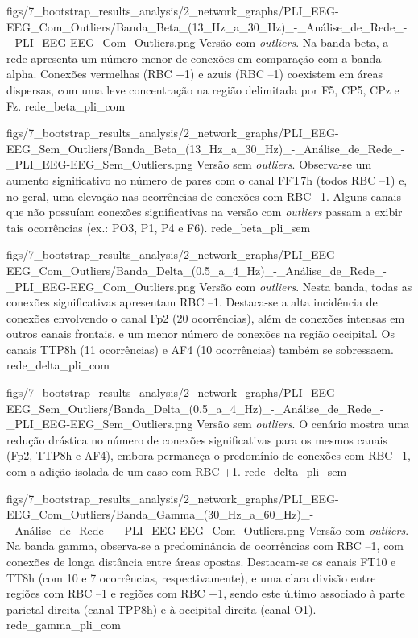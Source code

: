 \smallfigure
{figs/7_bootstrap_results_analysis/2_network_graphs/PLI_EEG-EEG_Com_Outliers/Banda_Beta_(13_Hz_a_30_Hz)_-_Análise_de_Rede_-_PLI_EEG-EEG_Com_Outliers.png}
{Versão com \textit{outliers}. Na banda beta, a rede apresenta um número menor de conexões em comparação com a banda alpha. Conexões vermelhas (RBC +1) e azuis (RBC –1) coexistem em áreas dispersas, com uma leve concentração na região delimitada por F5, CP5, CPz e Fz.}
{rede_beta_pli_com}

\smallfigure
{figs/7_bootstrap_results_analysis/2_network_graphs/PLI_EEG-EEG_Sem_Outliers/Banda_Beta_(13_Hz_a_30_Hz)_-_Análise_de_Rede_-_PLI_EEG-EEG_Sem_Outliers.png}
{Versão sem \textit{outliers}. Observa-se um aumento significativo no número de pares com o canal FFT7h (todos RBC –1) e, no geral, uma elevação nas ocorrências de conexões com RBC –1. Alguns canais que não possuíam conexões significativas na versão com \textit{outliers} passam a exibir tais ocorrências (ex.: PO3, P1, P4 e F6).}
{rede_beta_pli_sem}

\smallfigure
{figs/7_bootstrap_results_analysis/2_network_graphs/PLI_EEG-EEG_Com_Outliers/Banda_Delta_(0.5_a_4_Hz)_-_Análise_de_Rede_-_PLI_EEG-EEG_Com_Outliers.png}
{Versão com \textit{outliers}. Nesta banda, todas as conexões significativas apresentam RBC –1. Destaca-se a alta incidência de conexões envolvendo o canal Fp2 (20 ocorrências), além de conexões intensas em outros canais frontais, e um menor número de conexões na região occipital. Os canais TTP8h (11 ocorrências) e AF4 (10 ocorrências) também se sobressaem.}
{rede_delta_pli_com}

\smallfigure
{figs/7_bootstrap_results_analysis/2_network_graphs/PLI_EEG-EEG_Sem_Outliers/Banda_Delta_(0.5_a_4_Hz)_-_Análise_de_Rede_-_PLI_EEG-EEG_Sem_Outliers.png}
{Versão sem \textit{outliers}. O cenário mostra uma redução drástica no número de conexões significativas para os mesmos canais (Fp2, TTP8h e AF4), embora permaneça o predomínio de conexões com RBC –1, com a adição isolada de um caso com RBC +1.}
{rede_delta_pli_sem}

\smallfigure
{figs/7_bootstrap_results_analysis/2_network_graphs/PLI_EEG-EEG_Com_Outliers/Banda_Gamma_(30_Hz_a_60_Hz)_-_Análise_de_Rede_-_PLI_EEG-EEG_Com_Outliers.png}
{Versão com \textit{outliers}. Na banda gamma, observa-se a predominância de ocorrências com RBC –1, com conexões de longa distância entre áreas opostas. Destacam-se os canais FT10 e TT8h (com 10 e 7 ocorrências, respectivamente), e uma clara divisão entre regiões com RBC –1 e regiões com RBC +1, sendo este último associado à parte parietal direita (canal TPP8h) e à occipital direita (canal O1).}
{rede_gamma_pli_com}

